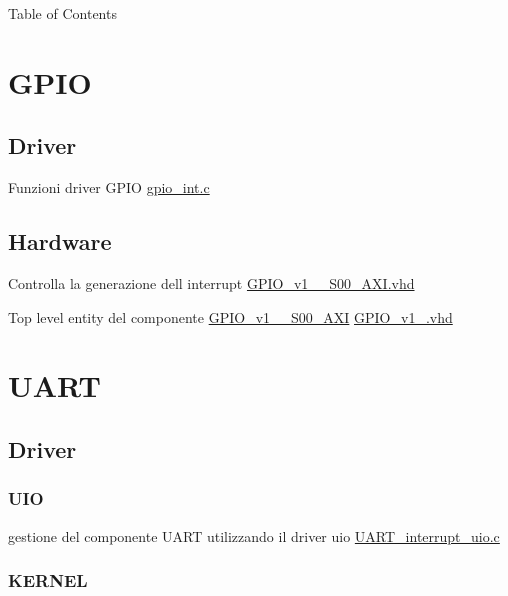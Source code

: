 \begin{DoxyParagraph}{Table of Contents}

\end{DoxyParagraph}
\hypertarget{index_GPIO}{}\section{G\+P\+IO}\label{index_GPIO}
\hypertarget{index_Driver}{}\subsection{Driver}\label{index_Driver}

\begin{DoxyItemize}
\item Funzioni driver G\+P\+IO \hyperlink{gpio__int_8c}{gpio\+\_\+int.\+c} 
\end{DoxyItemize}\hypertarget{index_Hardware}{}\subsection{Hardware}\label{index_Hardware}

\begin{DoxyItemize}
\item Controlla la generazione dell\textquotesingle{} interrupt \hyperlink{GPIO__v1__0__S00__AXI_8vhd}{G\+P\+I\+O\+\_\+v1\+\_\+\_\+\+S00\+\_\+\+A\+X\+I.\+vhd}
\item Top level entity del componente \hyperlink{classGPIO__v1__0__S00__AXI}{G\+P\+I\+O\+\_\+v1\+\_\+\_\+\+S00\+\_\+\+A\+XI} \hyperlink{GPIO__v1__0_8vhd}{G\+P\+I\+O\+\_\+v1\+\_.\+vhd} 
\end{DoxyItemize}\hypertarget{index_UART}{}\section{U\+A\+RT}\label{index_UART}
\hypertarget{index_Driver}{}\subsection{Driver}\label{index_Driver}
\hypertarget{index_UIO}{}\subsubsection{U\+IO}\label{index_UIO}

\begin{DoxyItemize}
\item gestione del componente U\+A\+RT utilizzando il driver uio \hyperlink{UART__interrupt__uio_8c}{U\+A\+R\+T\+\_\+interrupt\+\_\+uio.\+c} 
\end{DoxyItemize}\hypertarget{index_KERNEL}{}\subsubsection{K\+E\+R\+N\+EL}\label{index_KERNEL}

